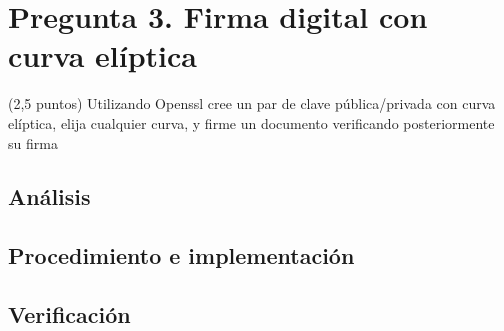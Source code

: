 \section{Pregunta 3. Firma digital con curva elíptica}
\label{sec:pregunta3}

\begin{enunciado}{(2,5 puntos)}
Utilizando Openssl cree un par de clave pública/privada con curva elíptica, elija cualquier curva, y firme un documento verificando posteriormente su firma
\end{enunciado}

\subsection{Análisis}

\subsection{Procedimiento e implementación}

\subsection{Verificación}


